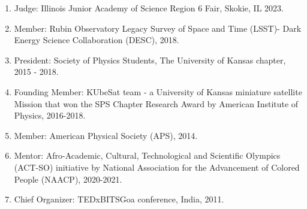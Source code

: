 \documentclass[letterpaper]{article}
\begin{document}
\begin{enumerate}

\item Judge: Illinois Junior Academy of Science Region 6 Fair, Skokie, IL 2023.

\item Member: Rubin Observatory Legacy Survey of Space and Time (LSST)- Dark Energy Science Collaboration (DESC), 2018. 

\item President: Society of Physics Students, The University of Kansas chapter, 2015 - 2018.

\item Founding Member: KUbeSat team - a University of Kansas miniature satellite Mission that won the SPS Chapter Research Award by American Institute of Physics, 2016-2018. 

\item Member: American Physical Society (APS), 2014. 

\item Mentor: Afro-Academic, Cultural, Technological and Scientific Olympics (ACT-SO) initiative by National Association for the Advancement of Colored People (NAACP),  2020-2021. 

\item Chief Organizer: TEDxBITSGoa conference, India, 2011.

\end{enumerate}

\bigskip

\end{document}
